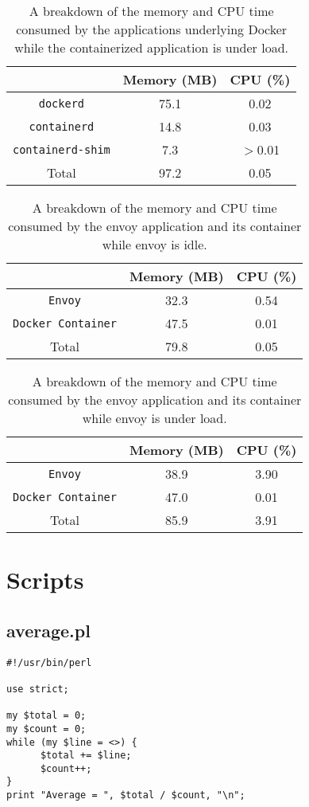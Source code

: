 \documentclass{article}
\begin{document}
\begin{table}[H]
\begin{tabular}{ |c|c|c| }
 \hline
   & Memory (MB) & CPU (\%) \\ 
 \hline
 \texttt{dockerd} & 75.1 & 0.02 \\
 \hline
 \texttt{containerd} & 14.8 & 0.03 \\
 \hline
 \texttt{containerd-shim} & 7.3 & $>$0.01 \\
 \hline\hline
 Total & 97.2 & 0.05 \\
 \hline
\end{tabular}
\caption{A breakdown of the memory and CPU time consumed by the applications underlying Docker while the containerized application is under load.}
\label{table:5}
\end{table}

\begin{table}[H]
\begin{tabular}{ |c|c|c| }
 \hline
   & Memory (MB) & CPU (\%) \\ 
 \hline
 \texttt{Envoy} & 32.3 & 0.54 \\
 \hline
 \texttt{Docker Container} & 47.5 & 0.01 \\
 \hline\hline
 Total & 79.8 & 0.05 \\
 \hline
\end{tabular}
\caption{A breakdown of the memory and CPU time consumed by the envoy application and its container while envoy is idle.}
\label{table:6}
\end{table}

\begin{table}[H]
\begin{tabular}{ |c|c|c| }
 \hline
   & Memory (MB) & CPU (\%) \\ 
 \hline
 \texttt{Envoy} & 38.9 & 3.90 \\
 \hline
 \texttt{Docker Container} & 47.0 & 0.01 \\
 \hline\hline
 Total & 85.9 & 3.91 \\
 \hline
\end{tabular}
\caption{A breakdown of the memory and CPU time consumed by the envoy application and its container while envoy is under load.}
\label{table:7}
\end{table}

\section{Scripts}
\subsection{average.pl}
\begin{verbatim}
#!/usr/bin/perl

use strict;

my $total = 0;
my $count = 0;
while (my $line = <>) {
      $total += $line;
      $count++;
}
print "Average = ", $total / $count, "\n";
\end{verbatim}
\end{document}
